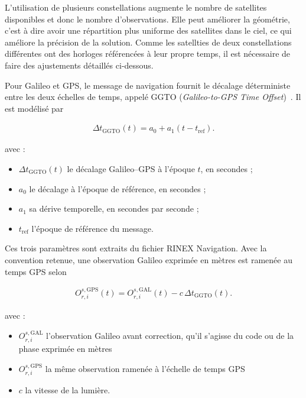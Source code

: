 L'utilisation de plusieurs constellations augmente le nombre de satellites
disponibles et donc le nombre d'observations. Elle peut améliorer la
géométrie, c'est à dire avoir une répartition plus uniforme des satellites dans le ciel, ce qui améliore la précision de la solution. 
Comme les satellties de deux constellations différentes ont des horloges référencées à leur propre temps, 
il est nécessaire de faire des ajustements détaillés ci-dessous.

Pour Galileo et GPS, le message de navigation fournit le décalage déterministe
entre les deux échelles de temps, appelé GGTO (\textit{Galileo-to-GPS Time
Offset})~\cite{galileoOsSisIcd21}. Il est modélisé par

\begin{align}
\Delta t_{\mathrm{GGTO}}(t)
=
a_0+a_1\left(t-t_{\mathrm{ref}}\right).
\label{eq:ggto}
\end{align}

avec :

\begin{itemize}
    \item $\Delta t_{\mathrm{GGTO}}(t)$ le décalage Galileo--GPS à l'époque
    $t$, en secondes ;
    \item $a_0$ le décalage à l'époque de référence, en secondes ;
    \item $a_1$ sa dérive temporelle, en secondes par seconde ;
    \item $t_{\mathrm{ref}}$ l'époque de référence du message.
\end{itemize}

Ces trois paramètres sont extraits du fichier RINEX Navigation. 
Avec la convention retenue, une observation Galileo
exprimée en mètres est ramenée au temps GPS selon

\begin{align}
O_{r,i}^{s,\mathrm{GPS}}(t)
=
O_{r,i}^{s,\mathrm{GAL}}(t)
-c\,\Delta t_{\mathrm{GGTO}}(t).
\label{eq:ggto_observation_correction}
\end{align}

avec :

\begin{itemize}
    \item $O_{r,i}^{s,\mathrm{GAL}}$ l'observation Galileo avant correction,
    qu'il s'agisse du code ou de la phase exprimée en mètres 
    \item $O_{r,i}^{s,\mathrm{GPS}}$ la même observation ramenée à l'échelle
    de temps GPS 
    \item $c$ la vitesse de la lumière.
\end{itemize}

